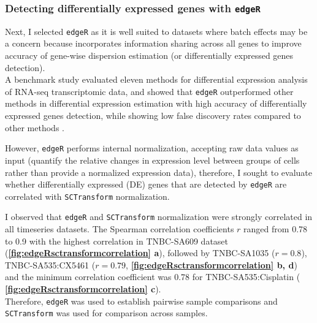 
\subsubsection{Detecting differentially expressed genes with \texttt{edgeR}}

Next, I selected \texttt{edgeR} as it is well suited to datasets where batch effects may be a concern because incorporates information sharing across all genes to improve accuracy of gene-wise dispersion estimation (or differentially expressed genes detection).
\\
A benchmark study evaluated eleven methods for differential expression analysis of RNA-seq transcriptomic data, and showed that \texttt{edgeR} outperformed other methods in differential expression estimation with high accuracy of differentially expressed genes detection, while showing low false discovery rates compared to other methods \cite{soneson2013comparison}. 

However, \texttt{edgeR} performs internal normalization, accepting raw data values as input (quantify the relative changes in expression level between groups of cells rather than provide a normalized expression data), therefore, I sought to evaluate whether differentially expressed (DE) genes that are detected by \texttt{edgeR} are correlated with \texttt{SCTransform} normalization. 


I observed that \texttt{edgeR} and \texttt{SCTransform} normalization were strongly correlated in all timeseries datasets. The Spearman correlation coefficients $r$ ranged from 0.78 to 0.9 with the highest correlation in TNBC-SA609 dataset  (\textbf{\autoref{fig:edgeRsctransformcorrelation} a}), followed by TNBC-SA1035 ($r=0.8$),  TNBC-SA535:CX5461 ($r=0.79$,   \textbf{\autoref{fig:edgeRsctransformcorrelation} b, d}) and the minimum correlation coefficient was 0.78 for TNBC-SA535:Cisplatin ( \textbf{\autoref{fig:edgeRsctransformcorrelation} c}).
\\
Therefore, \texttt{edgeR} was used to establish pairwise sample comparisons and \texttt{SCTransform} was used for comparison across samples.



